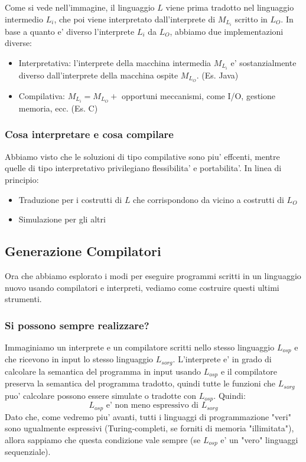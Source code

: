Come si vede nell'immagine, il linguaggio $ L $ viene prima tradotto nel linguaggio intermedio $ L_i $, che poi viene interpretato dall'interprete di $ M_{L_i} $ scritto in $ L_O $. In base a quanto e' diverso l'interprete $ L_i $ da $ L_O $, abbiamo due implementazioni diverse:
\begin{itemize}
  \item Interpretativa: l'interprete della macchina intermedia $ M_{L_i} $ e' sostanzialmente diverso dall'interprete della macchina ospite $ M_{L_O} $. (Es. Java)
  \item Compilativa: $ M_{L_i} = M_{L_O} +  $ opportuni meccanismi, come I/O, gestione memoria, ecc. (Es. C)
\end{itemize}

\subsubsection{Cosa interpretare e cosa compilare}

Abbiamo visto che le soluzioni di tipo compilative sono piu' effcenti, mentre quelle di tipo interpretativo privilegiano flessibilita' e portabilita'. In linea di principio:
\begin{itemize}
  \item Traduzione per i costrutti di $ L $ che corrispondono da vicino a costrutti di $ L_O $
  \item Simulazione per gli altri
\end{itemize}

\subsection{Generazione Compilatori}

Ora che abbiamo esplorato i modi per eseguire programmi scritti in un linguaggio nuovo usando compilatori e interpreti, vediamo come costruire questi ultimi strumenti.

\subsubsection{Si possono sempre realizzare?}
Immaginiamo un interprete e un compilatore scritti nello stesso linguaggio $ L_{osp} $ e che ricevono in input lo stesso linguaggio $ L_{sorg} $. L'interprete e' in grado di calcolare la semantica del programma in input usando $ L_{osp} $ e il compilatore preserva la semantica del programma tradotto, quindi tutte le funzioni che $ L_{sorg} $ puo' calcolare possono essere simulate o tradotte con $ L_{osp} $. Quindi:
\[
L_{osp} \text{ e' non meno espressivo di } L_{sorg}
\]
Dato che, come vedremo piu' avanti, tutti i linguaggi di programmazione "veri"  sono ugualmente espressivi (Turing-completi, se forniti di memoria "illimitata"), allora sappiamo che questa condizione vale sempre (se $ L_{osp} $ e' un "vero" linguaggi sequenziale).

